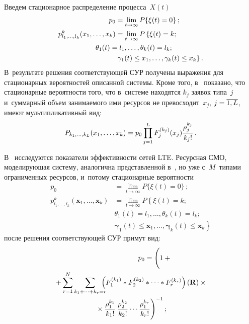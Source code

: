 \begin{multicols}{2}
Введем стационарное распределение процесса~$X(t)$
\begin{align*}
p_0&=\lim_{t\rightarrow \infty}P\{\xi(t)=0\}\,;
\\
p^k_{l_1,\ldots,l_k}(x_1,\ldots,x_k)&=\lim\limits_{t\rightarrow \infty}P
\left\{\xi(t)=k; \right.\\
&\hspace*{-10mm}\theta_1(t)=l_1,\ldots,\theta_k(t)=l_k; \\
&\left.\gamma_1(t)\leq x_1,\ldots,\gamma_k(t)\leq x_k
\right\}.
\end{align*}
В~результате решения соответствующей СУР получены выражения для стационарных 
вероятностей описанной сис\-те\-мы.
Кроме того, в~\cite{Naumov_6_2015} показано, что стационарные вероятности того, 
что в~сис\-те\-ме находятся
$k_j$ заявок типа~$j$ и~суммарный объем занимаемого ими ресурсов не превосходит~$x_j$, 
$j\hm=\overline{1,L}$, имеют мультипликативный вид:
\begin{equation*}
P_{k_1,\ldots,k_L}(x_1,\ldots,x_k)=p_0
\prod\limits_{j=1}^{L}F_j^{(k_j)}(x_j)\displaystyle\frac{\displaystyle \rho_j^{k_j}\mathstrut}{\displaystyle k_j!\mathstrut}\,.
\end{equation*}

В~\cite{Naumov_10_2015} исследуются показатели эффективности сетей LTE. 
Ресурсная СМО, моделирующая сис\-те\-му, аналогична представленной 
в~\cite{Naumov_6_2015}, но уже с~$M$~типами ограниченных ресурсов, и~потому 
стационарные вероятности
\begin{align*}
p_0&=\lim\limits_{t\rightarrow \infty}P\{\xi(t)=0\}\,;
\\
p^k_{l_1,\ldots,l_k}(\mathbf{x}_1,\ldots,\mathbf{x}_k)&=
\lim\limits_{t\rightarrow \infty}P
\left\{\xi(t)=k;\right.\\
 &\theta_1(t)=l_1,\ldots,\theta_k(t)=l_k;\\
&\left.\boldsymbol{\gamma}_1(t)\leq \mathbf{x}_1,\ldots,\boldsymbol{\gamma}_k(t)\leq 
\mathbf{x}_k
\right\}
\end{align*}
после решения соответствующей СУР примут вид:
\begin{multline*}
\hspace*{70pt}p_0=\left( 
\vphantom{\sum\limits_{r=1}^{N}}
1+{}\right.\\
\left.{}+\sum\limits_{r=1}^{N}\sum\limits_{k_1+\cdots+k_r=r}\hspace*{-3mm}\left(
F_1^{(k_1)}*F_2^{(k_2)}*\cdots *F_r^{(k_r)}
\right)(\mathbf{R})\times{}\right.\\
\left.{}\times \fr{\rho_1^{k_1}}{k_1!}\,\fr{\rho_2^{k_2}}{k_2!}\cdots
\fr{\rho_1^{k_r}}{k_r!} \right)^{-1};
\end{multline*}


\end{multicols}
